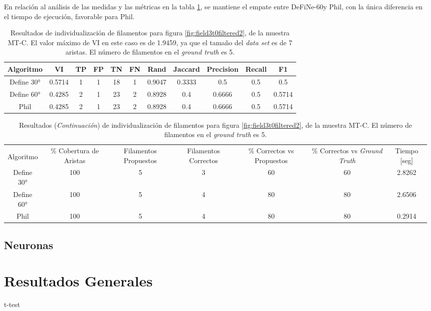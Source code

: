 En relaci\'on al an\'alisis de las medidas y las m\'etricas en la tabla \ref{tab:field3t0filtered2}, se mantiene el empate entre DeFiNe-60\textdegree y Phil, con la \'unica diferencia en el tiempo de ejecuci\'on, favorable para Phil. 

\begin{table}[h]
    \centering
    \begin{tabular}{|c|c|c|c|c|c|c|c|c|c|c|}
    \hline
        Algoritmo & VI & TP & FP &TN &FN & Rand	& Jaccard &	Precision &	Recall &	F1 \\ \hline
        Define 30° & 0.5714 & 1 & 1 & 18 & 1 & 0.9047 & 0.3333 & 0.5      & 0.5 & 0.5\\
        Define 60° & 0.4285 & 2 & 1 & 23 & 2 & 0.8928 & 0.4 & 0.6666 & 0.5 & 0.5714\\ 
        Phil & 0.4285  & 2 & 1 & 23 & 2 & 0.8928 & 0.4 & 0.6666 & 0.5 & 0.5714\\
        \hline
    \end{tabular}
    \caption{Resultados de individualizaci\'on de filamentos para figura \ref{fig:field3t0filtered2}, de la muestra MT-C. El valor m\'aximo de VI en este caso es de 1.9459, ya que el tama\~no del {\it data set} es de 7 aristas. El n\'umero de filamentos en el {\it ground truth} es 5.}
    \label{tab:field3t0filtered2}
\end{table}
\addtocounter{table}{-1}
\begin{table}[h]
    \centering
    \begin{tabular}{|c|c|c|c|c|c|c|}
    \hline
         & \multirow{4}{2cm}{\centering \% Cobertura de Aristas} & \multirow{4}{2cm}{Filamentos Propuestos} & \multirow{4}{2cm}{Filamentos Correctos} & \multirow{4}{2.5cm}{\% Correctos vs Propuestos} & \multirow{4}{2.5cm}{\centering \% Correctos vs {\it Ground Truth}} & \multirow{4}{1.2cm}{\centering Tiempo [seg]} \\
         &  &  &  & & &  \\
        Algoritmo &  &  &  & & &  \\
        &  &  &  & & &  \\ \hline
        Define 30° & 100 & 5 & 3 & 60 & 60 & 2.8262\\
        Define 60° & 100 & 5 & 4 & 80 & 80 & 2.6506\\ 
        Phil & 100 & 5 & 4 & 80 & 80 & 0.2914\\
        \hline
    \end{tabular}
    \caption{Resultados ({\it Continuaci\'on}) de individualizaci\'on de filamentos para figura \ref{fig:field3t0filtered2}, de la muestra MT-C. El n\'umero de filamentos en el {\it ground truth} es 5.}
\end{table}

\subsection{Neuronas}

\section{Resultados Generales}
t-test